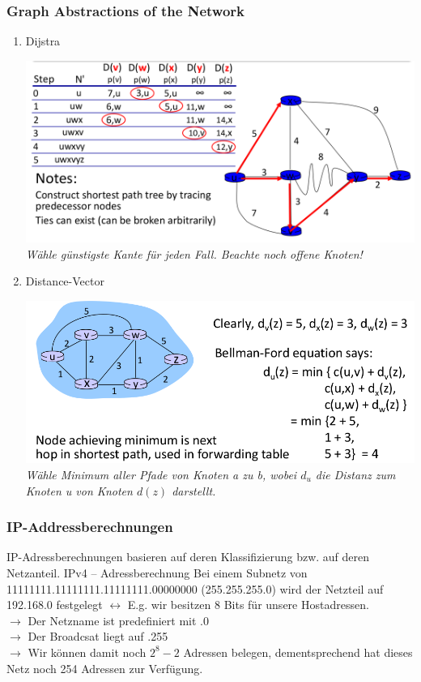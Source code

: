 \documentclass{scrartcl}
\begin{document}
    \subsubsection{Graph Abstractions of the Network}
    \begin{enumerate}
        \item Dijstra
        \begin{center}
            \includegraphics[width=\textwidth]{Dijkstra.png}\\
            \textit{Wähle günstigste Kante für jeden Fall. Beachte noch offene Knoten!}
        \end{center}
        \item Distance-Vector
        \begin{center}
            \includegraphics[width=\textwidth]{DistanceVector.png}\\
        \textit{Wähle Minimum aller Pfade von Knoten a zu b, wobei $d_u$ die Distanz zum Knoten u von Knoten $d(z)$ darstellt.}
        \end{center}
        
    \end{enumerate}
    \subsubsection{ IP-Addressberechnungen}
    IP-Adressberechnungen basieren auf deren Klassifizierung bzw. auf deren Netzanteil.
        IPv4 -- Adressberechnung
        Bei einem Subnetz von 11111111.11111111.11111111.00000000 (255.255.255.0) wird der Netzteil auf 192.168.0 festgelegt $\leftrightarrow$ E.g. wir besitzen 8 Bits für unsere Hostadressen.\\
        $\rightarrow$ Der Netzname ist predefiniert mit .0\\
        $\rightarrow$ Der Broadcsat liegt auf .255\\
        $\rightarrow$ Wir können damit noch $2^8 - 2$ Adressen belegen, dementsprechend hat dieses Netz noch 254 Adressen zur Verfügung.\\
        
\end{document}
